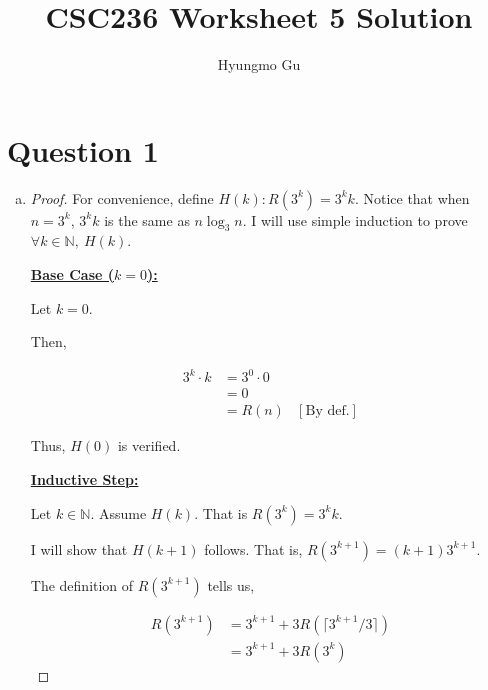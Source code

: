 \documentclass[12pt]{article}
\begin{document}
\title{CSC236 Worksheet 5 Solution}
\author{Hyungmo Gu}
\maketitle

\section*{Question 1}
\begin{enumerate}[a.]
    \item

    \begin{proof}
        For convenience, define $H(k): R(3^k) = 3^kk$. Notice that when $n = 3^k$,
        $3^kk$ is the same as $n\log_3 n$. I will use simple induction to prove
        $\forall k \in \mathbb{N},\:H(k)$.

        \bigskip

        \underline{\textbf{Base Case ($k = 0$):}}

        \bigskip

        Let $k = 0$.

        \bigskip

        Then,

        \begin{align}
            3^k \cdot k &= 3^0 \cdot 0\\
            &= 0\\
            &= R(n) & [\text{By def.}]
        \end{align}

        Thus, $H(0)$ is verified.

        \bigskip

        \underline{\textbf{Inductive Step:}}

        \bigskip

        Let $k \in \mathbb{N}$. Assume $H(k)$. That is $R(3^k) = 3^kk$.

        \bigskip

        I will show that $H(k+1)$ follows. That is, $R(3^{k+1}) = (k+1)3^{k+1}$.

        \bigskip

        The definition of $R(3^{k+1})$ tells us,

        \begin{align}
            R(3^{k+1}) &= 3^{k+1} + 3R(\lceil 3^{k+1}/3 \rceil)\\
            &= 3^{k+1} + 3R(3^k)
        \end{align}


\end{proof}
\end{enumerate}
\end{document}
